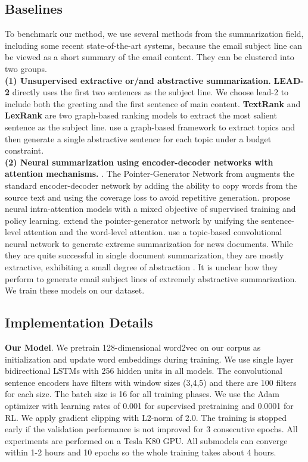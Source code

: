 \documentclass[11pt,a4paper]{article}
\begin{document}
\subsection{Baselines}
To benchmark our method, we use several methods from the summarization field, including some recent state-of-the-art systems, because the email subject line can be viewed as a short summary of the email content.
They can be clustered into two groups.\\
\noindent \textbf{(1) Unsupervised extractive or/and abstractive summarization.}
\textbf{LEAD-2} directly uses the first two sentences as the subject line. We choose lead-2 to include both the greeting and the first sentence of main content.
\textbf{TextRank} \cite{mihalcea2004textrank} and \textbf{LexRank} \cite{erkan2004lexrank} are two graph-based ranking models to extract the most salient sentence as the subject line.
\textbf{} use a graph-based framework to extract topics and then generate a single abstractive sentence for each topic under a budget constraint.
\\
\noindent \textbf{(2) Neural summarization using encoder-decoder networks with attention mechanisms.} \cite{sutskever2014sequence,bahdanau2015neural}.
The Pointer-Generator Network from \textbf{} augments the standard encoder-decoder network by adding the ability to copy words from the source text and using the coverage loss to avoid repetitive generation.
\textbf{} propose neural intra-attention models with a mixed objective of supervised training and policy learning.
\textbf{} extend the pointer-generator network by unifying the sentence-level attention and the word-level attention.
\textbf{} use a topic-based convolutional neural network to generate extreme summarization for news documents.
While they are quite successful in single document summarization, they are mostly extractive, exhibiting a small degree of abstraction \cite{narayan2018dont}.
It is unclear how they perform to generate email subject lines of extremely abstractive summarization.
We train these models on our dataset.

\subsection{Implementation Details}
\textbf{Our Model}.
We pretrain 128-dimensional word2vec \cite{mikolov2013distributed} on our corpus as initialization and update word embeddings during training.
We use single layer bidirectional LSTMs with 256 hidden units in all models.
The convolutional sentence encoders have filters with window sizes (3,4,5) and there are 100 filters for each size.
The batch size is 16 for all training phases.
We use the Adam optimizer \cite{kingma2015adam} with learning rates of 0.001 for supervised pretraining and 0.0001 for RL.
We apply gradient clipping \cite{pascanu2013difficulty} with L2-norm of 2.0.
The training is stopped early if the validation performance is not improved for 3 consecutive epochs.
All experiments are performed on a Tesla K80 GPU.
All submodels can converge within 1-2 hours and 10 epochs so the whole training takes about 4 hours.\\
\end{document}
